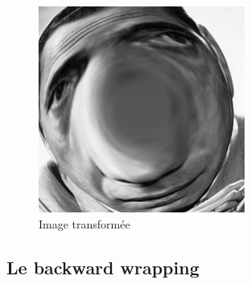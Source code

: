 \begin{figure}[!h]
	\centering
	\includegraphics[scale = 0.5]{bogart_tr.png}
	\caption{Image transformée}
\end{figure}

\newpage

	\subsection*{Le backward wrapping}
	

